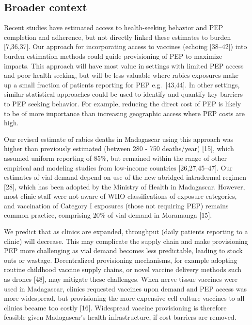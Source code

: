 \documentclass[
  oneside]{book}
\begin{document}
\hypertarget{broader-context}{%
\subsection{Broader context}\label{broader-context}}

Recent studies have estimated access to health-seeking behavior and PEP
completion and adherence, but not directly linked these estimates to
burden {[}7,36,37{]}. Our approach for incorporating access to vaccines
(echoing {[}38--42{]}) into burden estimation methods could guide
provisioning of PEP to maximize impacts. This approach will have most
value in settings with limited PEP access and poor health seeking, but
will be less valuable where rabies exposures make up a small fraction of
patients reporting for PEP e.g.~{[}43,44{]}. In other settings, similar
statistical approaches could be used to identify and quantify key
barriers to PEP seeking behavior. For example, reducing the direct cost
of PEP is likely to be of more importance than increasing geographic
access where PEP costs are high.

Our revised estimate of rabies deaths in Madagascar using this approach
was higher than previously estimated (between 280 - 750 deaths/year)
{[}15{]}, which assumed uniform reporting of 85\%, but remained within the
range of other empirical and modeling studies from low-income countries
{[}26,27,45--47{]}. Our estimates of vial demand depend on use of the new
abridged intradermal regimen {[}28{]}, which has been adopted by the
Ministry of Health in Madagascar. However, most clinic staff were not
aware of WHO classifications of exposure categories, and vaccination of
Category I exposures (those not requiring PEP) remains common practice,
comprising 20\% of vial demand in Moramanga {[}15{]}.

We predict that as clinics are expanded, throughput (daily patients
reporting to a clinic) will decrease. This may complicate the supply
chain and make provisioning PEP more challenging as vial demand becomes
less predictable, leading to stock outs or wastage. Decentralized
provisioning mechanisms, for example adopting routine childhood vaccine
supply chains, or novel vaccine delivery methods such as drones {[}48{]},
may mitigate these challenges. When nerve tissue vaccines were used in
Madagascar, clinics requested vaccines upon demand and PEP access was
more widespread, but provisioning the more expensive cell culture
vaccines to all clinics became too costly {[}16{]}. Widespread vaccine
provisioning is therefore feasible given Madagascar's health
infrastructure, if cost barriers are removed.
\end{document}
